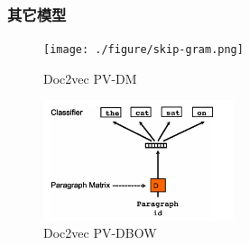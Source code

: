 \documentclass[notheorems]{beamer}
\begin{document}
\begin{frame}
\frametitle{其它模型}
\begin{figure}
\begin{minipage}[t]{0.5\linewidth}
\centering	
\texttt{[image: ./figure/skip-gram.png]}
\caption{Doc2vec PV-DM}
\label{fig:side:a}	
\end{minipage}%
\begin{minipage}[t]{0.5\linewidth}
\centering
\includegraphics[width=2.2in]{./figure/Distributed_bag_of_word.png}
\caption{Doc2vec PV-DBOW}		
\label{fig:side:b}	
\end{minipage}
\end{figure}
\end{frame}
\end{document}
